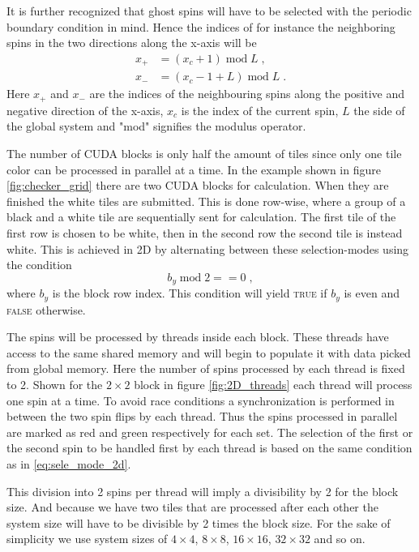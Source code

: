 \documentclass[paper=a4, fontsize=11pt]{scrartcl} %
\numberwithin{equation}{section} %
\numberwithin{figure}{section} %
\numberwithin{table}{section} %
\begin{document}
It is further recognized that ghost spins will have to be selected with the periodic boundary condition in mind. Hence the indices of for instance the neighboring spins in the two directions along the x-axis will be
\begin{align*}
x_+&=(x_c+1)\; \text{mod} \; L \;, \\
x_-&=(x_c-1+L) \; \text{mod} \; L \;.
\end{align*}
Here $x_+$ and $x_-$ are the indices of the neighbouring spins along the positive and negative direction of the x-axis, $x_c$ is the index of the current spin, $L$ the side of the global system and "mod" signifies the modulus operator.

The number of CUDA blocks is only half the amount of tiles since only one tile color can be processed in parallel at a time. In the example shown in figure \ref{fig:checker_grid} there are two CUDA blocks for calculation. When they are finished the white tiles are submitted. This is done row-wise, where a group of a black and a white tile are sequentially sent for calculation. The first tile of the first row is chosen to be white, then in the second row the second tile is instead white. This is achieved in 2D by alternating between these selection-modes using the condition 
\begin{equation}
b_y\; \text{mod} \; 2 == 0 \;,
\label{eq:sele_mode_2d}
\end{equation}
where $b_y$ is the block row index. This condition will yield \textsc{true} if $b_y$ is even and \textsc{false} otherwise.

The spins will be processed by threads inside each block. These threads have access to the same shared memory and will begin to populate it with data picked from global memory. Here the number of spins processed by each thread is fixed to 2. Shown for the $2\times2$ block in figure \ref{fig:2D_threads} each thread will process one spin at a time. To avoid race conditions a synchronization is performed in between the two spin flips by each thread. Thus the spins processed in parallel are marked as red and green respectively for each set. The selection of the first or the second spin to be handled first by each thread is based on the same condition as in \ref{eq:sele_mode_2d}.
 
This division into 2 spins per thread will imply a divisibility by 2 for the block size. And because we have two tiles that are processed after each other the system size will have to be divisible by 2 times the block size. For the sake of simplicity we use system sizes of $4\times4$, $8\times8$, $16\times16$, $32\times32$ and so on.
\end{document}
